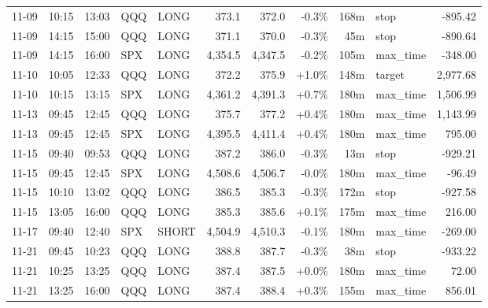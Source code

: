 \documentclass[11pt,a4paper,twoside]{article}
\begin{document}
\begin{center}
\begin{longtable}{>{\color{txtmain}}l l l l l r r r r >{\color{txtmain}}l r}
11-09 & 10:15 & 13:03 & QQQ & LONG & 373.1 & 372.0 & \textcolor{lossred}{-0.3\%} & 168m & stop & \textcolor{lossred}{-895.42} \\
11-09 & 14:15 & 15:00 & QQQ & LONG & 371.1 & 370.0 & \textcolor{lossred}{-0.3\%} & 45m & stop & \textcolor{lossred}{-890.64} \\
11-09 & 14:15 & 16:00 & SPX & LONG & 4,354.5 & 4,347.5 & \textcolor{lossred}{-0.2\%} & 105m & max\_time & \textcolor{lossred}{-348.00} \\
11-10 & 10:05 & 12:33 & QQQ & LONG & 372.2 & 375.9 & \textcolor{wingreen}{+1.0\%} & 148m & target & \textcolor{wingreen}{2,977.68} \\
11-10 & 10:15 & 13:15 & SPX & LONG & 4,361.2 & 4,391.3 & \textcolor{wingreen}{+0.7\%} & 180m & max\_time & \textcolor{wingreen}{1,506.99} \\
11-13 & 09:45 & 12:45 & QQQ & LONG & 375.7 & 377.2 & \textcolor{wingreen}{+0.4\%} & 180m & max\_time & \textcolor{wingreen}{1,143.99} \\
11-13 & 09:45 & 12:45 & SPX & LONG & 4,395.5 & 4,411.4 & \textcolor{wingreen}{+0.4\%} & 180m & max\_time & \textcolor{wingreen}{795.00} \\
11-15 & 09:40 & 09:53 & QQQ & LONG & 387.2 & 386.0 & \textcolor{lossred}{-0.3\%} & 13m & stop & \textcolor{lossred}{-929.21} \\
11-15 & 09:45 & 12:45 & SPX & LONG & 4,508.6 & 4,506.7 & \textcolor{lossred}{-0.0\%} & 180m & max\_time & \textcolor{lossred}{-96.49} \\
11-15 & 10:10 & 13:02 & QQQ & LONG & 386.5 & 385.3 & \textcolor{lossred}{-0.3\%} & 172m & stop & \textcolor{lossred}{-927.58} \\
11-15 & 13:05 & 16:00 & QQQ & LONG & 385.3 & 385.6 & \textcolor{wingreen}{+0.1\%} & 175m & max\_time & \textcolor{wingreen}{216.00} \\
11-17 & 09:40 & 12:40 & SPX & SHORT & 4,504.9 & 4,510.3 & \textcolor{lossred}{-0.1\%} & 180m & max\_time & \textcolor{lossred}{-269.00} \\
11-21 & 09:45 & 10:23 & QQQ & LONG & 388.8 & 387.7 & \textcolor{lossred}{-0.3\%} & 38m & stop & \textcolor{lossred}{-933.22} \\
11-21 & 10:25 & 13:25 & QQQ & LONG & 387.4 & 387.5 & \textcolor{wingreen}{+0.0\%} & 180m & max\_time & \textcolor{wingreen}{72.00} \\
11-21 & 13:25 & 16:00 & QQQ & LONG & 387.4 & 388.4 & \textcolor{wingreen}{+0.3\%} & 155m & max\_time & \textcolor{wingreen}{856.01} \\

\end{longtable}
\end{center}
\end{document}

